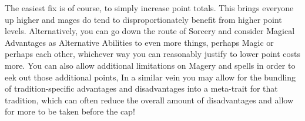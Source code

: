 \begin{multicols}{2}
	The easiest fix is of course, to simply increase point totals. This brings everyone up higher and mages do tend to disproportionately benefit from higher point levels. Alternatively, you can go down the route of \GURPS Sorcery and consider Magical Advantages as Alternative Abilities to even more things, perhaps Magic or perhaps each other, whichever way you can reasonably justify to lower point costs more. You can also allow additional limitations on Magery and spells in order to eek out those additional points, In a similar vein you may allow for the bundling of tradition-specific advantages and disadvantages into a meta-trait for that tradition, which can often reduce the overall amount of disadvantages and allow for more to be taken before the cap!
	
\end{multicols}